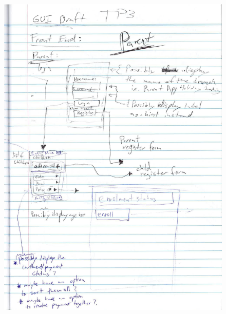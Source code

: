 \documentclass{l3proj}
\begin{document}
{
\begin{figure}[h]
\centering
\includegraphics[scale=0.50]{0085_001-page-001.jpg}
\end{figure}
}

\pagebreak
\end{document}
